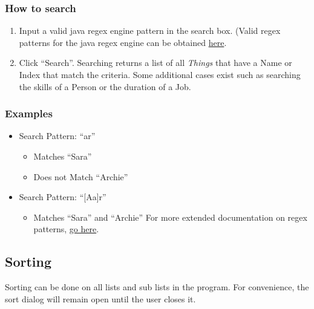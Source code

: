 \documentclass[english,floatsintext,man]{apa6}
\providecommand{\tightlist}{%
  \setlength{\itemsep}{0pt}\setlength{\parskip}{0pt}}
\begin{document}
\subsubsection{How to search}\label{how-to-search}

\begin{enumerate}
\def\labelenumi{\arabic{enumi}.}
\tightlist
\item
  Input a valid java regex engine pattern in the search box. (Valid
  regex patterns for the java regex engine can be obtained
  \href{http://docs.oracle.com/javase/8/docs/api/java/util/regex/Pattern.html}{here}.
\item
  Click \enquote{Search}. Searching returns a list of all \emph{Things}
  that have a Name or Index that match the criteria. Some additional
  cases exist such as searching the skills of a Person or the duration
  of a Job.
\end{enumerate}

\subsubsection{Examples}\label{examples}

\begin{itemize}
\tightlist
\item
  Search Pattern: \enquote{ar}

  \begin{itemize}
  \tightlist
  \item
    Matches \enquote{Sara}
  \item
    Does not Match \enquote{Archie}
  \end{itemize}
\item
  Search Pattern: \enquote{{[}A\textbar{}a{]}r}

  \begin{itemize}
  \tightlist
  \item
    Matches \enquote{Sara} and \enquote{Archie} For more extended
    documentation on regex patterns,
    \href{http://docs.oracle.com/javase/8/docs/api/java/util/regex/Pattern.html}{go
    here}.
  \end{itemize}
\end{itemize}

\subsection{Sorting}\label{sorting}

Sorting can be done on all lists and sub lists in the program. For
convenience, the sort dialog will remain open until the user closes it.
\end{document}
